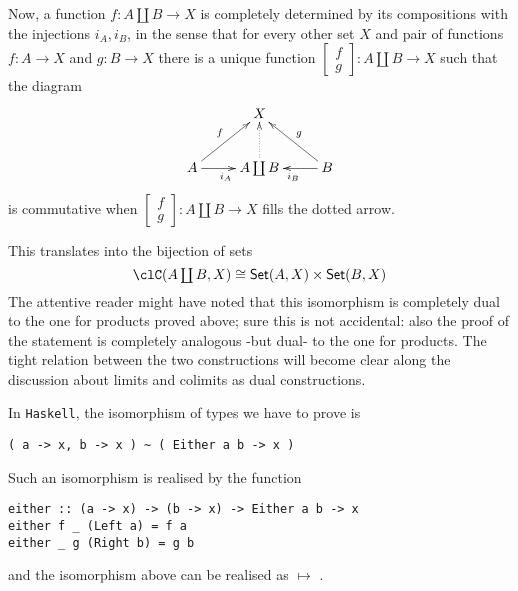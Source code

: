\documentclass[11pt]{article}
\begin{document}
Now, a function \(f : A\coprod B\to X\) is completely determined by its compositions with the injections \(i_A,i_B\), in the sense that for every other set \(X\) and pair of functions \(f : A\to X\) and \(g : B\to X\) there is a unique function \(\left[\begin{smallmatrix} f\\g \end{smallmatrix}\right] : A\coprod B \to X\) such that the diagram
\[
	\xymatrix{
		&X& \\
		A \ar[r]_{i_A}\ar[ur]^f & A\coprod B \ar@{.>}[u] & B\ar[l]^{i_B}\ar[ul]_g
	}
\]
is commutative when \(\left[\begin{smallmatrix} f\\g \end{smallmatrix}\right] : A\coprod B \to X\) fills the dotted arrow.

This translates into the bijection of sets
\[\textstyle
	\clC(A\coprod B,X) \cong {\sf Set}(A,X)\times {\sf Set}(B,X)
\]
The attentive reader might have noted that this isomorphism is completely dual to the one for products proved above; sure this is not accidental: also the proof of the statement is completely analogous -but dual- to the one for products. The tight relation between the two constructions will become clear along the discussion about limits and colimits as dual constructions.

In \verb|Haskell|, the isomorphism of types we have to prove is
\begin{verbatim}
( a -> x, b -> x ) ~ ( Either a b -> x )
\end{verbatim}
Such an isomorphism is realised by the function
\begin{verbatim}
either :: (a -> x) -> (b -> x) -> Either a b -> x
either f _ (Left a) = f a
either _ g (Right b) = g b
\end{verbatim}
and the isomorphism above can be realised as  \(\mapsto\) .
\end{document}
